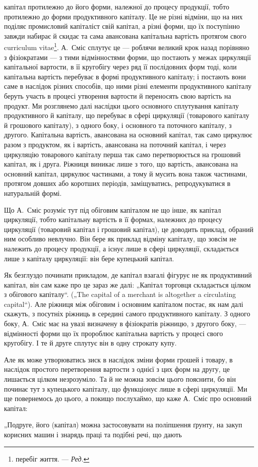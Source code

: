 \parcont{}  %
капітал протилежно до його форми, належної до процесу продукції,
тобто протилежно до форми продуктивного капіталу. Це не різні
відміни, що на них поділяє промисловий капіталіст свій капітал, а різні
форми, що їх поступінно завжди набирає й скидає та сама авансована
капітальна вартість протягом свого curriculum vitae\footnote*{
перебіг життя. — \emph{Ред.}
}. А.~Сміс сплутує це —
роблячи великий крок назад порівняно з фізіократами — з тими відмінностями
форми, що постають у межах циркуляції капітальної вартости, в її кругобігу
через ряд її послідовних форм тоді, коли капітальна вартість перебуває
в формі продуктивного капіталу; і постають вони саме в наслідок
різних способів, що ними різні елементи продуктивного капіталу беруть
участь в процесі утворення вартости й переносять свою вартість на продукт.
Ми розглянемо далі наслідки цього основного сплутування капіталу
продуктивного й капіталу, що перебуває в сфері циркуляції (товарового
капіталу й грошового капіталу), з одного боку, і основного та поточного
капіталу, з другого. Капітальна вартість, авансована на основний капітал,
так само циркулює разом з продуктом, як і вартість, авансована на поточний
капітал, і через циркуляцію товарового капіталу перша так само перетворюється
на грошовий капітал, як і друга. Ріжниця виникає лише з того,
що вартість, авансована на основний капітал, циркулює частинами, а тому
й мусить вона також частинами, протягом довших або коротших періодів,
заміщуватись, репродукуватися в натуральній формі.

Що А.~Сміс розуміє тут під обіговим капіталом не що інше, як капітал
циркуляції, тобто капітальну вартість в її формах, належних до процесу
циркуляції (товаровий капітал і грошовий капітал), це доводить приклад,
обраний ним особливо невлучно. Він бере як приклад відміну капіталу, що
зовсім не належить до процесу продукції, а існує лише в сфері циркуляції,
складається лише з капіталу циркуляції: він бере купецький капітал.

Як безглуздо починати прикладом, де капітал взагалі фігурує не як
продуктивний капітал, він сам каже про це зараз же далі: „Капітал торговця
складається цілком з обігового капіталу“. („The capital of a merchant
is altogether a circulating capital“). Але ріжниця між обіговим і основним
капіталом постає, як нам далі скажуть, з посутніх ріжниць в середині
самого продуктивного капіталу. З одного боку, А.~Сміс має на
увазі визначену в фізіократів ріжницю, з другого боку, — відмінності форми
що їх пророблює капітальна вартість у процесі свого кругобігу. І те
й друге сплутує він в одну строкату купу.

Але як може утворюватись зиск в наслідок зміни форми грошей і
товару, в наслідок простого перетворення вартости з однієї з цих форм
на другу, це лишається цілком незрозуміло. Та й не можна зовсім цього
пояснити, бо він починає тут з купецького капіталу, що функціонує
лише в сфері циркуляції. Ми ще повернемось до цього, а покищо послухаймо,
що каже А.~Сміс про основний капітал:

„Подруге, його (капітал) можна застосовувати на поліпшення ґрунту,
на закуп корисних машин і знарядь праці та подібні речі, що дають
\parbreak{}  %
